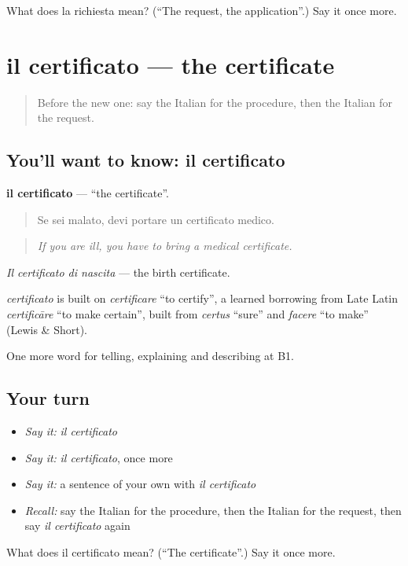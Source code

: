 \begin{tcolorbox}[breakable,colback=teal!4,colframe=teal!35!black,title={Before you move on}]
What does la richiesta mean? (\textquotedblleft{}The request, the application\textquotedblright{}.) Say it once more.
\end{tcolorbox}
\section[il certificato]{il certificato — the certificate}

\label{lesson:IT-C389-certificato}



\begin{quote}
Before the new one: say the Italian for the procedure, then the Italian for the request.
\end{quote}

\subsection*{You'll want to know: il certificato}
\textbf{il certificato} — \textquotedblleft{}the certificate\textquotedblright{}.

\begin{quote}
Se sei malato, devi portare un certificato medico.
\end{quote}

\begin{quote}
\emph{If you are ill, you have to bring a medical certificate.}
\end{quote}

\emph{Il certificato di nascita} — the birth certificate.

\begin{cousinweb}
\emph{certificato} is built on \emph{certificare} \textquotedblleft{}to certify\textquotedblright{}, a learned borrowing from Late Latin \emph{certificāre} \textquotedblleft{}to make certain\textquotedblright{}, built from \emph{certus} \textquotedblleft{}sure\textquotedblright{} and \emph{facere} \textquotedblleft{}to make\textquotedblright{} (Lewis \& Short).
\end{cousinweb}

\begin{grammarlens}[title={What you've built}]
One more word for telling, explaining and describing at B1.
\end{grammarlens}

\subsection*{Your turn}
\begin{itemize}
\raggedright
  \item \emph{Say it:} \emph{il certificato}
  \item \emph{Say it:} \emph{il certificato}, once more
  \item \emph{Say it:} a sentence of your own with \emph{il certificato}
  \item \emph{Recall:} say the Italian for the procedure, then the Italian for the request, then say \emph{il certificato} again
\end{itemize}

\begin{tcolorbox}[breakable,colback=teal!4,colframe=teal!35!black,title={Before you move on}]
What does il certificato mean? (\textquotedblleft{}The certificate\textquotedblright{}.) Say it once more.
\end{tcolorbox}
